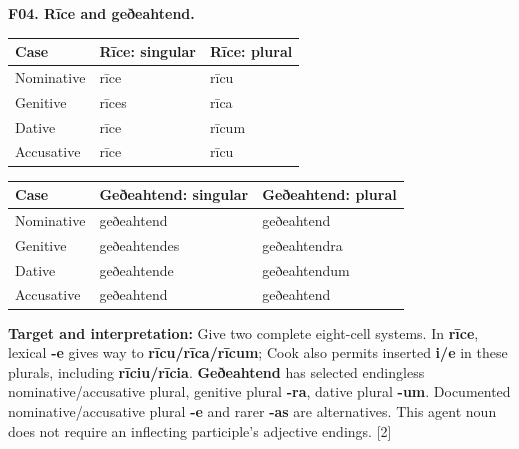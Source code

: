 \par\begin{minipage}{\linewidth}\raggedright
\textbf{F04. Rīce and geðeahtend.}

\par\begingroup
\fontsize{10.5}{13.2}\selectfont
\setlength{\LTleft}{0pt}\setlength{\LTright}{\fill}
\noindent
\begin{tabular}{@{}>{\raggedright\arraybackslash}p{38.56mm}>{\raggedright\arraybackslash}p{41.26mm}>{\raggedright\arraybackslash}p{38.56mm}@{}}
\toprule
\textbf{Case} & \textbf{Rīce: singular} & \textbf{Rīce: plural} \\
\midrule
Nominative & rīce & rīcu \\
Genitive & rīces & rīca \\
Dative & rīce & rīcum \\
Accusative & rīce & rīcu \\
\bottomrule
\end{tabular}
\par\endgroup

\par\begingroup
\fontsize{10.5}{13.2}\selectfont
\setlength{\LTleft}{0pt}\setlength{\LTright}{\fill}
\noindent
\begin{tabular}{@{}>{\raggedright\arraybackslash}p{29.37mm}>{\raggedright\arraybackslash}p{45.82mm}>{\raggedright\arraybackslash}p{43.18mm}@{}}
\toprule
\textbf{Case} & \textbf{Geðeahtend: singular} & \textbf{Geðeahtend: plural} \\
\midrule
Nominative & geðeahtend & geðeahtend \\
Genitive & geðeahtendes & geðeahtendra \\
Dative & geðeahtende & geðeahtendum \\
Accusative & geðeahtend & geðeahtend \\
\bottomrule
\end{tabular}
\par\endgroup

\textbf{Target and interpretation:} Give two complete eight-cell systems. In \textbf{rīce}, lexical \textbf{-e} gives way to \textbf{rīcu/\allowbreak{}rīca/\allowbreak{}rīcum}; Cook also permits inserted \textbf{i/\allowbreak{}e} in these plurals, including \textbf{rīciu/\allowbreak{}rīcia}. \textbf{Geðeahtend} has selected endingless nominative/\allowbreak{}accusative plural, genitive plural \textbf{-ra}, dative plural \textbf{-um}. Documented nominative/\allowbreak{}accusative plural \textbf{-e} and rarer \textbf{-as} are alternatives. This agent noun does not require an inflecting participle's adjective endings. [2]

\end{minipage}\par\addvspace{4pt}


